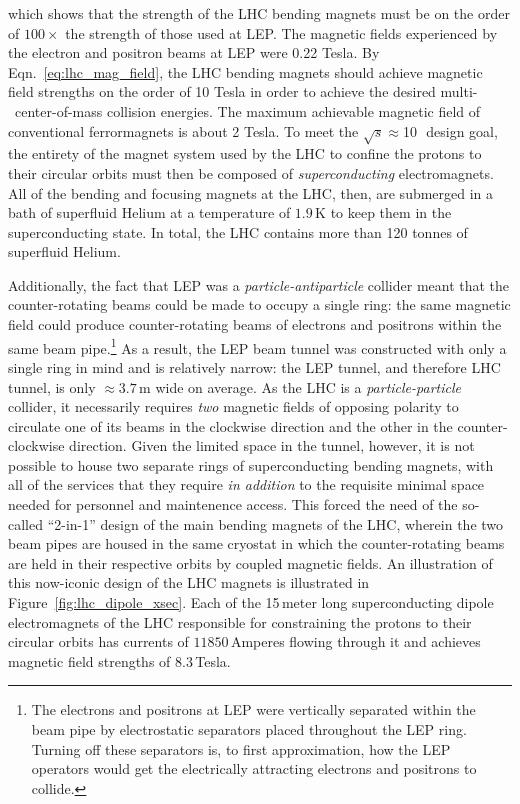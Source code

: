 which shows that the strength of the LHC bending magnets must be on the order of $100\times$
the strength of those used at LEP. The magnetic fields experienced by the electron and positron beams
at LEP were 0.22 Tesla. By Eqn.~\ref{eq:lhc_mag_field}, the LHC bending magnets should achieve magnetic field
strengths on the order of 10 Tesla in order to achieve the desired multi-\TeV~center-of-mass collision energies.
The maximum achievable magnetic field of conventional ferrormagnets is about 2 Tesla.
To meet the $\sqrt{s}\approx$10\,\TeV~design goal, the entirety of the magnet system used by the LHC to confine the protons to their circular orbits
must then be composed of \textit{superconducting} electromagnets. %
All of the bending and focusing magnets at the LHC, then, are submerged in a bath of superfluid Helium
at a temperature of $1.9$\,K to keep them in the superconducting state. In total, the LHC contains more than 120 tonnes of superfluid Helium.

Additionally, the fact that LEP was a \textit{particle-antiparticle} collider meant that the counter-rotating
beams could be made to occupy a single ring: the same magnetic field could produce counter-rotating beams of
electrons and positrons within the same beam pipe.\footnote{The electrons and positrons at LEP were vertically separated
within the beam pipe by electrostatic separators placed throughout the LEP ring. Turning off these separators
is, to first approximation, how the LEP operators would get the electrically attracting electrons and positrons to collide.}
As a result, the LEP beam tunnel was constructed with only a single ring in mind and is relatively narrow: the LEP tunnel,
and therefore LHC tunnel, is only $\approx3.7$\,m wide on average.
As the LHC is a \textit{particle-particle} collider, it necessarily requires \textit{two} magnetic fields
of opposing polarity to circulate one of its beams in the clockwise direction and the other in the
counter-clockwise direction.
Given the limited space in the tunnel, however, it is not possible to house two separate rings
of superconducting bending magnets, with all of the services that they require \textit{in addition} to the requisite
minimal space needed for personnel and maintenence access.
This forced the need of the so-called ``2-in-1'' design of the main bending magnets of the LHC, wherein the two
beam pipes are housed in the same cryostat in which the counter-rotating beams are held in their
respective orbits by coupled magnetic fields.
An illustration of this now-iconic design of the LHC magnets is illustrated in Figure~\ref{fig:lhc_dipole_xsec}.
Each of the 15\,meter long superconducting dipole electromagnets of the LHC responsible for constraining the protons to their circular
orbits has currents of $11850$\,Amperes flowing through it and achieves magnetic field strengths of $8.3$\,Tesla.

